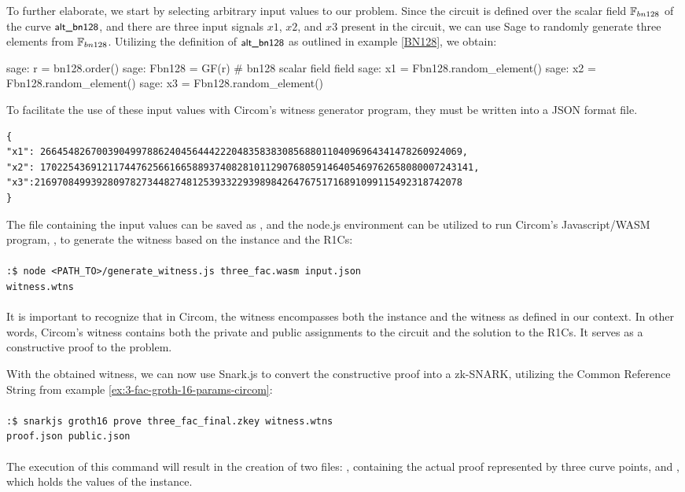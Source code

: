\begin{example}
To further elaborate, we start by selecting arbitrary input values to our problem. Since the circuit is defined over the scalar field $\mathbb{F}_{bn128}$ of the curve $\textsf{\small alt\_bn128}$, and there are three input signals $x1$, $x2$, and $x3$ present in the circuit, we can use Sage to randomly generate three elements from $\mathbb{F}_{bn128}$. Utilizing the definition of $\textsf{\small alt\_bn128}$ as outlined in example \ref{BN128}, we obtain:
\begin{sagecommandline}
sage: r = bn128.order() 
sage: Fbn128 = GF(r) # bn128 scalar field field
sage: x1 = Fbn128.random_element()
sage: x2 = Fbn128.random_element()
sage: x3 = Fbn128.random_element()
\end{sagecommandline} 
To facilitate the use of these input values with Circom's witness generator program, they must be written into a JSON format file.
\begin{lstlisting}
{
"x1": 266454826700390499788624045644422204835838308568801104096964341478260924069,
"x2": 17022543691211744762566166588937408281011290768059146405469762658080007243141,
"x3":2169708499392809782734482748125393322939898426476751716891099115492318742078 
}
\end{lstlisting} 
The file containing the input values can be saved as , and the node.js environment can be utilized to run Circom's Javascript/WASM program, , to generate the witness based on the instance and the R1Cs:
\\
\\
\texttt{:\$ node <PATH\_TO>/generate\_witness.js three\_fac.wasm input.json\\ witness.wtns}
\\
\\
It is important to recognize that in Circom, the witness encompasses both the instance and the witness as defined in our context. In other words, Circom's witness contains both the private and public assignments to the circuit and the solution to the R1Cs. It serves as a constructive proof to the problem.

With the obtained witness, we can now use Snark.js to convert the constructive proof into a zk-SNARK, utilizing the Common Reference String from example \ref{ex:3-fac-groth-16-params-circom}:
\\
\\
\texttt{:\$ snarkjs groth16 prove three\_fac\_final.zkey witness.wtns \\ proof.json public.json}
\\
\\
The execution of this command will result in the creation of two files: , containing the actual proof represented by three curve points, and , which holds the values of the instance. 


\end{example}
